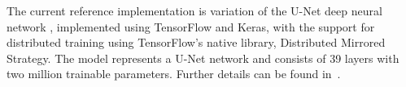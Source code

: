 \smallskip

 The current reference implementation is variation of  the U-Net deep neural network \cite{rodenberger-15}, implemented using TensorFlow and Keras, with the support for distributed training using  TensorFlow’s native library, Distributed Mirrored Strategy. The model represents a U-Net network and consists of 39 layers with two million trainable parameters. Further details can be found in~\cite{sciml-bench:2021}.  
